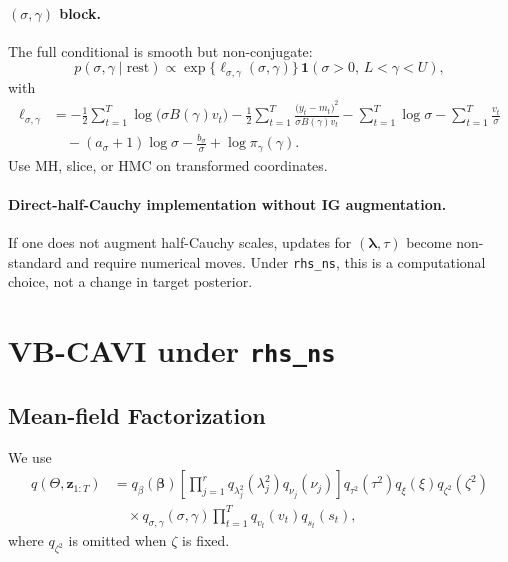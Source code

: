 \documentclass[11pt]{article}
\newcommand{\vect}[1]{\bm{#1}}
\begin{document}
\paragraph{$(\sigma,\gamma)$ block.}
The full conditional is smooth but non-conjugate:
\begin{equation}
  p(\sigma,\gamma\mid\text{rest})
  \propto
  \exp\{\ell_{\sigma,\gamma}(\sigma,\gamma)\}\,
  \mathbf{1}(\sigma>0,\,L<\gamma<U),
\end{equation}
with
\begin{equation}
\begin{aligned}
  \ell_{\sigma,\gamma}
  &= -\frac12\sum_{t=1}^T\log\big(\sigma B(\gamma)v_t\big)
     -\frac12\sum_{t=1}^T
      \frac{\big(y_t-m_t\big)^2}{\sigma B(\gamma)v_t}
     -\sum_{t=1}^T\log\sigma
     -\sum_{t=1}^T\frac{v_t}{\sigma}
  \\
  &\quad -(a_\sigma+1)\log\sigma - \frac{b_\sigma}{\sigma}
     +\log\pi_\gamma(\gamma).
\end{aligned}
\label{eq:sigmagamma-kernel}
\end{equation}
Use MH, slice, or HMC on transformed coordinates.

\paragraph{Direct-half-Cauchy implementation without IG augmentation.}
If one does not augment half-Cauchy scales, updates for $(\vect{\lambda},\tau)$ become non-standard and require numerical moves.
Under \texttt{rhs\_ns}, this is a computational choice, not a change in target posterior.

\section{VB-CAVI under \texttt{rhs\_ns}}
\label{sec:vb}

\subsection{Mean-field Factorization}

We use
\begin{equation}
\begin{aligned}
  q(\Theta,\vect{z}_{1:T})
  &= q_\beta(\vect{\beta})
     \left[\prod_{j=1}^r q_{\lambda_j^2}(\lambda_j^2)q_{\nu_j}(\nu_j)\right]
     q_{\tau^2}(\tau^2)q_\xi(\xi)
     q_{\zeta^2}(\zeta^2)
  \\
  &\quad\times q_{\sigma,\gamma}(\sigma,\gamma)
     \prod_{t=1}^T q_{v_t}(v_t)q_{s_t}(s_t),
\end{aligned}
\label{eq:vb-factorization}
\end{equation}
where $q_{\zeta^2}$ is omitted when $\zeta$ is fixed.
\end{document}

